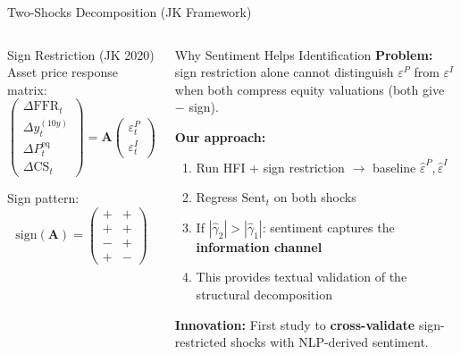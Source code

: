 \documentclass[aspectratio=169, 11pt]{beamer}
\begin{document}
\begin{frame}{Two-Shocks Decomposition (JK Framework)}
  \begin{columns}[T]
    \begin{ablock}{Sign Restriction (JK 2020)}
      \footnotesize
      Asset price response matrix:
      \begin{equation*}
        \begin{pmatrix}
          \Delta \mathrm{FFR}_t \\
          \Delta y_t^{(10y)} \\
          \Delta P_t^{\mathrm{eq}} \\
          \Delta \mathrm{CS}_t
        \end{pmatrix}
        =
        \mathbf{A}
        \begin{pmatrix}
          \varepsilon_t^{P} \\
          \varepsilon_t^{I}
        \end{pmatrix}
      \end{equation*}

      Sign pattern:
      \[
        \mathrm{sign}(\mathbf{A}) =
        \begin{pmatrix}
          + & + \\
          + & + \\
          - & + \\
          + & -
        \end{pmatrix}
      \]
    \end{ablock}

    \begin{aalertblock}{Why Sentiment Helps Identification}
      \footnotesize
      \textbf{Problem:} sign restriction alone \alert{cannot distinguish} $\varepsilon^P$ from $\varepsilon^I$ when both compress equity valuations (both give $-$ sign).

      \vspace{0.4em}
      \textbf{Our approach:}
      \begin{enumerate}
        \item Run HFI + sign restriction $\to$ baseline $\hat{\varepsilon}^P, \hat{\varepsilon}^I$
        \item Regress $\mathrm{Sent}_t$ on both shocks
        \item If $|\hat{\gamma}_2| > |\hat{\gamma}_1|$: sentiment captures the \textbf{information channel}
        \item This provides \alert{textual validation} of the structural decomposition
      \end{enumerate}

      \vspace{0.3em}
      \textbf{Innovation:} First study to \textbf{cross-validate} sign-restricted shocks with NLP-derived sentiment.
    \end{aalertblock}
  \end{columns}
\end{frame}
\end{document}
